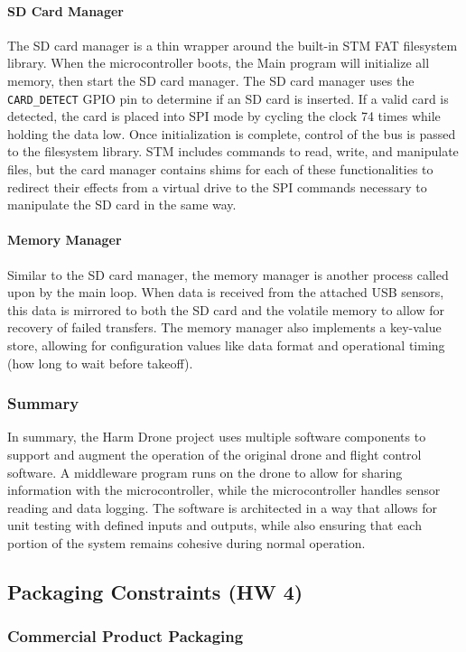 \documentclass[12pt]{article}
\begin{document}
\paragraph{SD Card Manager} The SD card manager is a thin wrapper around the built-in STM FAT filesystem library. When the microcontroller boots, the Main program will initialize all memory, then start the SD card manager. The SD card manager uses the \verb|CARD_DETECT| GPIO pin to determine if an SD card is inserted. If a valid card is detected, the card is placed into SPI mode by cycling the clock 74 times while holding the data low. Once initialization is complete, control of the bus is passed to the filesystem library. STM includes commands to read, write, and manipulate files, but the card manager contains shims for each of these functionalities to redirect their effects from a virtual drive to the SPI commands necessary to manipulate the SD card in the same way.

\paragraph{Memory Manager} Similar to the SD card manager, the memory manager is another process called upon by the main loop. When data is received from the attached USB sensors, this data is mirrored to both the SD card and the volatile memory to allow for recovery of failed transfers. The memory manager also implements a key-value store, allowing for configuration values like data format and operational timing (how long to wait before takeoff).
\subsubsection{Summary}
In summary, the Harm Drone project uses multiple software components to support and augment the operation of the original drone and flight control software. A middleware program runs on the drone to allow for sharing information with the microcontroller, while the microcontroller handles sensor reading and data logging. The software is architected in a way that allows for unit testing with defined inputs and outputs, while also ensuring that each portion of the system remains cohesive during normal operation.
\subsection{Packaging Constraints (HW 4)}
\subsubsection{Commercial Product Packaging}
\end{document}
